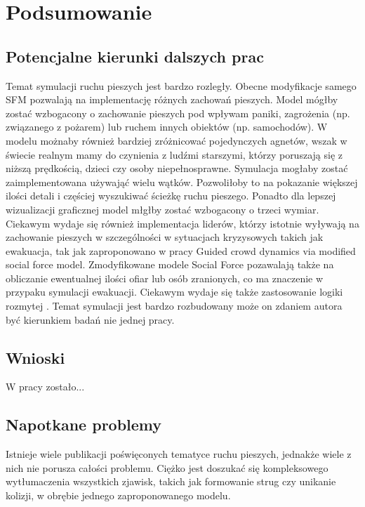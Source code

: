 \chapter{Podsumowanie}
\label{cha:podsumowanie}

\section{Potencjalne kierunki dalszych prac}
Temat symulacji ruchu pieszych jest bardzo rozległy. Obecne modyfikacje samego SFM pozwalają na implementację różnych zachowań pieszych. Model mógłby zostać wzbogacony o zachowanie pieszych pod wpływam paniki, zagrożenia (np. związanego z pożarem) lub ruchem innych obiektów (np. samochodów). W modelu możnaby również bardziej zróżnicować pojedynczych agnetów, wszak w świecie realnym mamy do czynienia z ludźmi starszymi, którzy poruszają się z niższą prędkością, dzieci czy osoby niepełnosprawne. Symulacja mogłaby zostać zaimplementowana używająć wielu wątków. Pozwoliłoby to na pokazanie większej ilości detali i częściej wyszukiwać ścieżkę ruchu pieszego. Ponadto dla lepszej wizualizacji graficznej model młgłby zostać wzbogacony o trzeci wymiar. Ciekawym wydaje się również implementacja liderów, którzy istotnie wyływają na zachowanie pieszych w szczególności w sytuacjach kryzysowych takich jak ewakuacja, tak jak zaproponowano w pracy Guided crowd dynamics via modified social force model\cite{GuideCrowdDynViaModifiedSocialForceModel}. Zmodyfikowane modele Social Force pozawalają także na obliczanie ewentualnej ilości ofiar lub osób zranionych, co ma znaczenie w przypaku symulacji ewakuacji. 
Ciekawym wydaje się także zastosowanie logiki rozmytej \cite{modelingFuzzyLogic}.
Temat symulacji jest bardzo rozbudowany może on zdaniem autora być kierunkiem badań nie jednej pracy. 

\section{Wnioski}
\label{sec:wnioski}

W pracy zostało...


\section{Napotkane problemy}

Istnieje wiele publikacji poświęconych tematyce ruchu pieszych, jednakże wiele z nich nie porusza całości problemu. Ciężko jest doszukać się kompleksowego wytłumaczenia wszystkich zjawisk, takich jak formowanie strug czy unikanie kolizji, w obrębie jednego zaproponowanego modelu.

